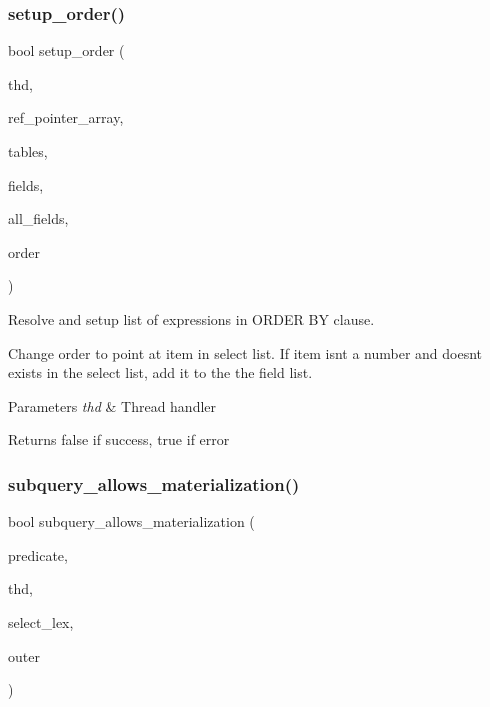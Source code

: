 \subsubsection{\texorpdfstring{setup\+\_\+order()}{setup\_order()}}
{\footnotesize\ttfamily bool setup\+\_\+order (\begin{DoxyParamCaption}\item[{T\+HD $\ast$}]{thd,  }\item[{\mbox{\hyperlink{classBounds__checked__array}{Ref\+\_\+ptr\+\_\+array}}}]{ref\+\_\+pointer\+\_\+array,  }\item[{\mbox{\hyperlink{structTABLE__LIST}{T\+A\+B\+L\+E\+\_\+\+L\+I\+ST}} $\ast$}]{tables,  }\item[{\mbox{\hyperlink{classList}{List}}$<$ \mbox{\hyperlink{classItem}{Item}} $>$ \&}]{fields,  }\item[{\mbox{\hyperlink{classList}{List}}$<$ \mbox{\hyperlink{classItem}{Item}} $>$ \&}]{all\+\_\+fields,  }\item[{\mbox{\hyperlink{structst__order}{O\+R\+D\+ER}} $\ast$}]{order }\end{DoxyParamCaption})}

Resolve and setup list of expressions in O\+R\+D\+ER BY clause.

Change order to point at item in select list. If item isn\textquotesingle{}t a number and doesn\textquotesingle{}t exists in the select list, add it to the the field list.


\begin{DoxyParams}{Parameters}
{\em thd} & Thread handler\\
\hline
\end{DoxyParams}
\begin{DoxyReturn}{Returns}
false if success, true if error 
\end{DoxyReturn}
\mbox{\label{group__Query__Resolver_ga67ba0f5092d8f16edd545f8685a5f104}} 
\subsubsection{\texorpdfstring{subquery\+\_\+allows\+\_\+materialization()}{subquery\_allows\_materialization()}}
{\footnotesize\ttfamily bool subquery\+\_\+allows\+\_\+materialization (\begin{DoxyParamCaption}\item[{\mbox{\hyperlink{classItem__in__subselect}{Item\+\_\+in\+\_\+subselect}} $\ast$}]{predicate,  }\item[{T\+HD $\ast$}]{thd,  }\item[{S\+E\+L\+E\+C\+T\+\_\+\+L\+EX $\ast$}]{select\+\_\+lex,  }\item[{const S\+E\+L\+E\+C\+T\+\_\+\+L\+EX $\ast$}]{outer }\end{DoxyParamCaption})}

